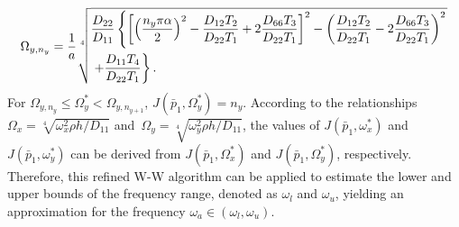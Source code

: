 \documentclass[preprint,12pt]{elsarticle}
\begin{document}
%
\begin{equation}\label{eq:J_simpy}
	\Omega_{y,n_y}= 
	\frac{1}{a} \sqrt[4]{%
		\begin{aligned}
			&\frac{D_{22}}{D_{11}}\left\{\left[\left(\frac{n_y\pi\alpha}{2}\right)^2 - \frac{D_{12}T_2}{D_{22}T_1} + 2 \frac{D_{66}T_3}{D_{22}T_1}\right]^2 - \left(\frac{D_{12}T_2}{D_{22}T_1} - 2 \frac{D_{66}T_3}{D_{22}T_1}\right)^2\right. \\
			&\left.  + \frac{D_{11}T_4}{D_{22}T_1}\right\}.
		\end{aligned}
	}
\end{equation}
%
For $\Omega_{y,n_y} \leq \Omega_y^* < \Omega_{y,n_{y+1}}$, $J(\bar{p}_1, \Omega_y^*) = n_y$.
According to the relationships 
$\Omega_x = \sqrt[4]{{\omega_x^2 \rho h}/{D_{11}}}$ and\ $\Omega_y = \sqrt[4]{{\omega_y^2 \rho h}/{D_{11}}}$, 
the values of $J(\bar{p}_1, \omega_x^*)$ and $J(\bar{p}_1, \omega_y^*)$ can be derived from $J(\bar{p}_1, \Omega_x^*)$ and $J(\bar{p}_1, \Omega_y^*)$, respectively. Therefore, this refined W-W algorithm can be applied to estimate the lower and upper bounds of the frequency range, denoted as $\omega_l$ and $\omega_u$, yielding an approximation for the frequency $\omega_a \in (\omega_l, \omega_u)$.
\end{document}
